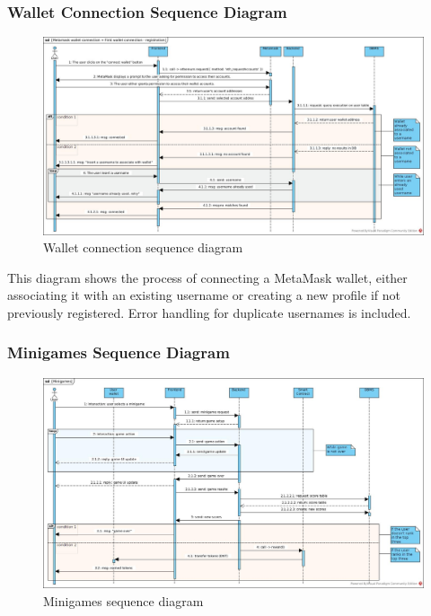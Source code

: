 \documentclass[../main.tex]{subfiles}
\begin{document}

\subsubsection{Wallet Connection Sequence Diagram}

\begin{figure}[H]
    \centering
    \includegraphics[width=\linewidth]{../src/diagrams/Metamask wallet connection + First wallet connection - registration.jpg}
    \caption{Wallet connection sequence diagram}
    \label{fig:walletConn_seqDiag}
\end{figure}

This diagram shows the process of connecting a MetaMask wallet, either associating it with an existing username or creating a new profile if not previously registered. Error handling for duplicate usernames is included.


\subsubsection{Minigames Sequence Diagram}

\begin{figure}[H]
    \centering
    \includegraphics[width=\linewidth]{../src/diagrams/Minigames.jpg}
    \caption{Minigames sequence diagram}
    \label{fig:Minigames_seqDiag}
\end{figure}
\end{document}
